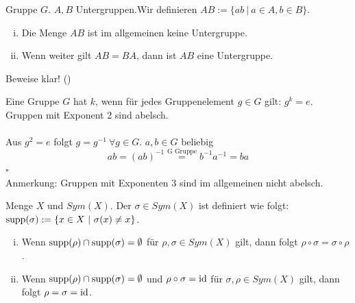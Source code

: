 Gruppe $G$. $A,B$ Untergruppen.Wir definieren $AB:=\{ab~|~a\in A,b \in B \}$.\\
\begin{enumerate}[(i)]
	\item Die Menge $AB$ ist im allgemeinen keine Untergruppe.
	\item Wenn weiter gilt $AB=BA$, dann ist $AB$ eine Untergruppe.
\end{enumerate}
Beweise klar! (\checkmark)

\newpage

\label{sub:zettel_2lga}
Eine Gruppe $G$ hat  $k$, wenn für jedes Gruppenelement $g\in G$ gilt: $g^k=e$.\\
\zz Gruppen mit Exponent 2 sind abelsch.\\

\\
Aus $g^2=e$ folgt $g=g^{-1}~\forall g\in G$. $a,b\in G$ beliebig\\
\[ ab=(ab)^{-1}\stackrel{\text{G Gruppe}}{=} b^{-1}a^{-1}=ba \]
\hfill $\square$\\
Anmerkung: Gruppen mit Exponenten 3 sind im allgemeinen nicht abelsch.

Menge $X$ und $Sym(X)$. Der  $\sigma \in Sym(X)$ ist definiert wie folgt: $\operatorname{supp}(\sigma):=\{x\in X~|~\sigma(x)\not=x \}$.
\begin{enumerate}[(i)]
	\item Wenn $\operatorname{supp}(\rho)\cap \operatorname{supp}(\sigma)=\emptyset$ für $\rho, \sigma \in Sym(X)$ gilt, dann folgt $\rho \circ \sigma=\sigma \circ \rho$.
	\item Wenn $\operatorname{supp}(\rho)\cap \operatorname{supp}(\sigma)=\emptyset$ und $\rho \circ \sigma=\operatorname{id}$ für $\sigma,\rho\in Sym(X)$ gilt, dann folgt $\rho=\sigma=\operatorname{id}$.
\end{enumerate}


